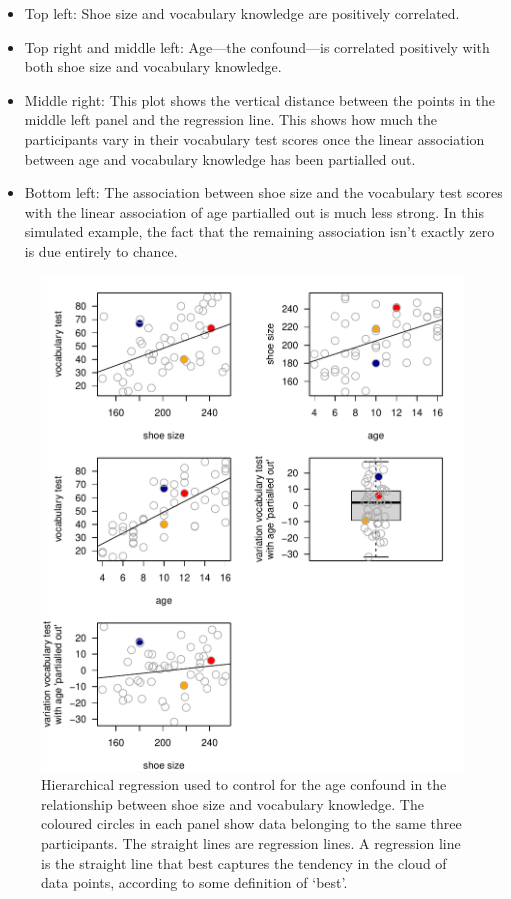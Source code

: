 \documentclass[a4paper]{tufte-book}\usepackage[]{graphicx}\usepackage[]{xcolor}
\begin{document}
\begin{itemize}
 \item Top left: Shoe size and vocabulary knowledge are positively correlated.

 \item Top right and middle left: Age---the confound---is correlated
 positively with both shoe size and vocabulary knowledge.

 \item Middle right: This plot shows the vertical distance between
 the points in the middle left panel and the regression line.
 This shows how much the participants vary in their vocabulary
 test scores once the linear association between age and vocabulary
 knowledge has been partialled out.

 \item Bottom left: The association between shoe size and the vocabulary
 test scores with the linear association of age partialled out is much
 less strong. In this simulated example, the fact that the remaining
 association isn't exactly zero is due entirely to chance.
\end{itemize}




\begin{figure}[tpbh]
  \centering
  \includegraphics[max width = \textwidth]{figure/hierarchical-1}
  \caption{Hierarchical regression used to control for the age confound in the relationship between shoe size and vocabulary knowledge. The coloured circles in each panel show data belonging to the same three participants. The straight lines are regression lines. A regression line is the straight line that best captures the tendency in the cloud of data points, according to some definition of `best'.}
  \label{fig:hierarchical}
\end{figure}
\end{document}
